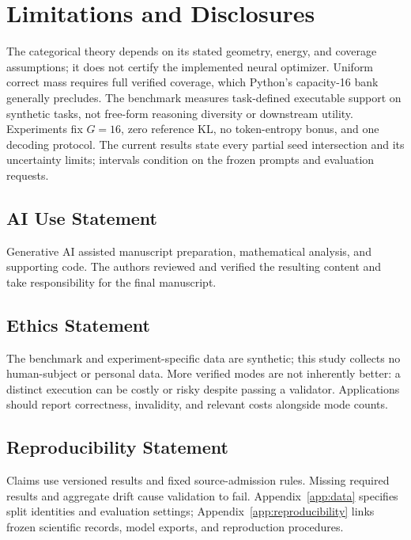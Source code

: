 \section{Limitations and Disclosures}
\label{app:limitations}

The categorical theory depends on its stated geometry, energy, and coverage
assumptions; it does not certify the implemented neural optimizer. Uniform
correct mass requires full verified coverage, which Python's capacity-16
bank generally precludes. The benchmark measures task-defined executable
support on synthetic tasks, not free-form reasoning diversity or downstream
utility. Experiments fix $G=16$, zero reference KL, no token-entropy bonus,
and one decoding protocol. The current results state every partial seed
intersection and its uncertainty limits; intervals condition on the frozen
prompts and evaluation requests.

\subsection{AI Use Statement}
\label{sec:ai-use}
Generative AI assisted manuscript preparation, mathematical analysis, and
supporting code. The authors reviewed and verified the resulting content
and take responsibility for the final manuscript.

\subsection{Ethics Statement}
The benchmark and experiment-specific data are synthetic; this study
collects no human-subject or personal data. More verified modes are not
inherently better: a distinct execution can be costly or risky despite
passing a validator. Applications should report correctness, invalidity,
and relevant costs alongside mode counts.

\subsection{Reproducibility Statement}
Claims use versioned results and fixed source-admission rules. Missing
required results and aggregate drift cause validation to fail.
Appendix~\ref{app:data} specifies split identities and evaluation settings;
Appendix~\ref{app:reproducibility} links frozen scientific records, model
exports, and reproduction procedures.
